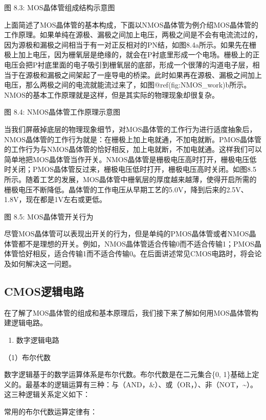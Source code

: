 \documentclass[]{ctexbook}
\providecommand{\tightlist}{%
  \setlength{\itemsep}{0pt}\setlength{\parskip}{0pt}}
\begin{document}
图 8.3: MOS晶体管组成结构示意图

上面简述了MOS晶体管的基本构成，下面以NMOS晶体管为例介绍MOS晶体管的工作原理。如果单纯在源极、漏极之间加上电压，两极之间是不会有电流流过的，因为源极和漏极之间相当于有一对正反相对的PN结，如图8.4a所示。如果先在栅极上加上电压，因为栅氧层是绝缘的，就会在P衬底里形成一个电场。栅极上的正电压会把P衬底里面的电子吸引到栅氧层的底部，形成一个很薄的沟道电子层，相当于在源极和漏极之间架起了一座导电的桥梁。此时如果再在源极、漏极之间加上电压，那么两极之间的电流就能流过来了，如图@ref(fig:NMOS\_work)b所示。NMOS的基本工作原理就是这样，但是其实际的物理现象却很复杂。

图 8.4: NMOS晶体管工作原理示意图

当我们屏蔽掉底层的物理现象细节，对MOS晶体管的工作行为进行适度抽象后，NMOS晶体管的工作行为就是：在栅极上加上电就通，不加电就断。PMOS晶体管的工作行为与NMOS晶体管的恰好相反，加上电就断，不加电就通。这样我们可以简单地把MOS晶体管当作开关。NMOS晶体管是栅极电压高时打开，栅极电压低时关闭；PMOS晶体管反过来，栅极电压低时打开，栅极电压高时关闭。如图8.5所示。随着工艺的发展，MOS晶体管中栅氧层的厚度越来越薄，使得开启所需的栅极电压不断降低。晶体管的工作电压从早期工艺的5.0V，降到后来的2.5V、1.8V，现在都是1V左右或更低。

图 8.5: MOS晶体管开关行为

尽管MOS晶体管可以表现出开关的行为，但是单纯的PMOS晶体管或者NMOS晶体管都不是理想的开关。例如，NMOS晶体管适合传输0而不适合传输1；PMOS晶体管恰好相反，适合传输1而不适合传输0。在后面讲述常见CMOS电路时，将会论及如何解决这一问题。

\hypertarget{cmosux903bux8f91ux7535ux8def}{%
\subsection{CMOS逻辑电路}\label{cmosux903bux8f91ux7535ux8def}}

在了解了MOS晶体管的组成和基本原理后，我们接下来了解如何用MOS晶体管构建逻辑电路。

\begin{enumerate}
\def\labelenumi{\arabic{enumi}.}
\tightlist
\item
  数字逻辑电路
\end{enumerate}

（1）布尔代数

数字逻辑基于的数学运算体系是布尔代数。布尔代数是在二元集合\{0, 1\}基础上定义的。最基本的逻辑运算有三种：与（AND，\&）、或（OR，\textbar）、非（NOT，\textasciitilde）。这三种逻辑关系定义如下：

常用的布尔代数运算定律有：
\end{document}
